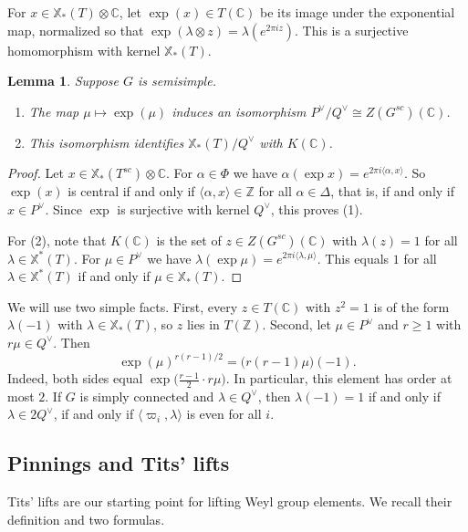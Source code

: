 \documentclass[psamsfonts]{amsart}
\newtheorem{lem}[thm]{Lemma}
\theoremstyle{definition}
\theoremstyle{remark}
\numberwithin{equation}{section}
\newcommand{\Z}{\mathbb{Z}}   %
\newcommand{\X}{\mathbb{X}}
\newcommand{\CC}{\mathbb{C}}
\numberwithin{equation}{section}
\theoremstyle{plain}
\begin{document}
For $x\in\X_*(T)\otimes\CC$, let $\exp(x)\in T(\CC)$ be its image under the exponential map, normalized so that $\exp(\lambda\otimes z)=\lambda(e^{2\pi iz})$. This is a surjective homomorphism with kernel $\X_*(T)$.

\begin{lem}\label{lem:exp}
Suppose $G$ is semisimple.
\begin{enumerate}[(1)]
\item The map $\mu\mapsto\exp(\mu)$ induces an isomorphism $P^\vee/Q^\vee\cong Z(G^{sc})(\CC)$.
\item This isomorphism identifies $\X_*(T)/Q^\vee$ with $K(\CC)$.
\end{enumerate}
\end{lem}

\begin{proof}
Let $x\in\X_*(T^{sc})\otimes\CC$. For $\alpha\in\Phi$ we have $\alpha(\exp x)=e^{2\pi i\langle\alpha,x\rangle}$. So $\exp(x)$ is central if and only if $\langle\alpha,x\rangle\in\Z$ for all $\alpha\in\Delta$, that is, if and only if $x\in P^\vee$. Since $\exp$ is surjective with kernel $Q^\vee$, this proves (1).

For (2), note that $K(\CC)$ is the set of $z\in Z(G^{sc})(\CC)$ with $\lambda(z)=1$ for all $\lambda\in\X^*(T)$. For $\mu\in P^\vee$ we have $\lambda(\exp\mu)=e^{2\pi i\langle\lambda,\mu\rangle}$. This equals $1$ for all $\lambda\in\X^*(T)$ if and only if $\mu\in\X_*(T)$.
\end{proof}

We will use two simple facts. First, every $z\in T(\CC)$ with $z^2=1$ is of the form $\lambda(-1)$ with $\lambda\in\X_*(T)$, so $z$ lies in $T(\Z)$. Second, let $\mu\in P^\vee$ and $r\geq1$ with $r\mu\in Q^\vee$. Then
\begin{equation}\label{eq:exp-power}
\exp(\mu)^{r(r-1)/2}=\big(r(r-1)\mu\big)(-1).
\end{equation}
Indeed, both sides equal $\exp\big(\tfrac{r-1}{2}\cdot r\mu\big)$. In particular, this element has order at most $2$. If $G$ is simply connected and $\lambda\in Q^\vee$, then $\lambda(-1)=1$ if and only if $\lambda\in 2Q^\vee$, if and only if $\langle\varpi_i,\lambda\rangle$ is even for all $i$.

\subsection{Pinnings and Tits' lifts}\label{subsec:tits}
Tits' lifts are our starting point for lifting Weyl group elements. We recall their definition and two formulas.
\end{document}
